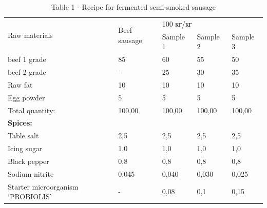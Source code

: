 \begin{table}[H]
\caption*{Table 1 - Recipe for fermented semi-smoked sausage}
\centering
\begin{tabular}{|l|l|lll|}
\hline
\multirow{2}{*}{Raw materials}    & \multirow{2}{*}{Beef sausage} & \multicolumn{3}{l|}{100 кг/кг}                                           \\ \cline{3-5} 
                                  &                               & \multicolumn{1}{l|}{Sample 1} & \multicolumn{1}{l|}{Sample 2} & Sample 3 \\ \hline
beef 1 grade                      & 85                            & \multicolumn{1}{l|}{60}       & \multicolumn{1}{l|}{55}       & 50       \\ \hline
beef 2 grade                      & -                             & \multicolumn{1}{l|}{25}       & \multicolumn{1}{l|}{30}       & 35       \\ \hline
Raw fat                           & 10                            & \multicolumn{1}{l|}{10}       & \multicolumn{1}{l|}{10}       & 10       \\ \hline
Egg powder                        & 5                             & \multicolumn{1}{l|}{5}        & \multicolumn{1}{l|}{5}        & 5        \\ \hline
Total quantity:                   & 100,00                        & \multicolumn{1}{l|}{100,00}   & \multicolumn{1}{l|}{100,00}   & 100,00   \\ \hline
\textbf{Spices:}                  &                               & \multicolumn{1}{l|}{}         & \multicolumn{1}{l|}{}         &          \\ \hline
Table salt                        & 2,5                           & \multicolumn{1}{l|}{2,5}      & \multicolumn{1}{l|}{2,5}      & 2,5      \\ \hline
Icing sugar                       & 1,0                           & \multicolumn{1}{l|}{1,0}      & \multicolumn{1}{l|}{1,0}      & 1,0      \\ \hline
Black pepper                      & 0,8                           & \multicolumn{1}{l|}{0,8}      & \multicolumn{1}{l|}{0,8}      & 0,8      \\ \hline
Sodium nitrite                    & 0,045                         & \multicolumn{1}{l|}{0,040}    & \multicolumn{1}{l|}{0,030}    & 0,025    \\ \hline
Starter microorganism ‘PROBIOLIS’ & -                             & \multicolumn{1}{l|}{0,08}     & \multicolumn{1}{l|}{0,1}      & 0,15     \\ \hline
\end{tabular}
\end{table}


